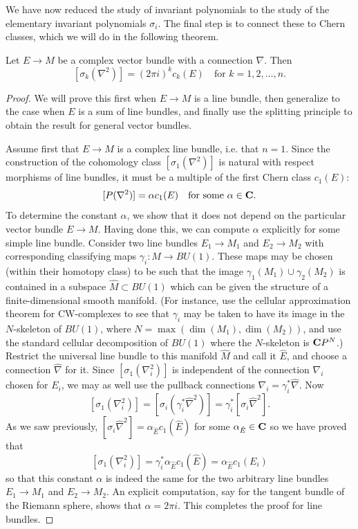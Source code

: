 \documentclass[a4paper,openany]{scrbook}
\begin{document}
We have now reduced the study of invariant polynomials to the study of the elementary invariant polynomials $\sigma_i$. The final step is to connect these to Chern classes, which we will do in the following theorem.

\begin{thm}
Let $E \to M$ be a complex vector bundle with a connection $\nabla$. Then
\[[\sigma_k(\nabla^2)] = (2\pi i)^kc_k(E) \quad \text{for } k = 1, 2, \ldots, n.\]
\begin{proof}
We will prove this first when $E \to M$ is a line bundle, then generalize to the case when $E$ is a sum of line bundles, and finally use the splitting principle to obtain the result for general vector bundles.

Assume first that $E \to M$ is a complex line bundle, i.e. that $n = 1$. Since the construction of the cohomology class $[\sigma_1(\nabla^2)]$ is natural with respect morphisms of line bundles, it must be a multiple of the first Chern class $c_1(E)$:
\[[P(\nabla^2)] = \alpha c_1(E) \quad\text{for some } \alpha \in \mathbf C.\]
To determine the constant $\alpha$, we show that it does not depend on the particular vector bundle $E \to M$. Having done this, we can compute $\alpha$ explicitly for some simple line bundle. Consider two line bundles $E_1 \to M_1$ and $E_2 \to M_2$ with corresponding classifying maps $\gamma_i \colon M \to BU(1)$. These maps may be chosen (within their homotopy class) to be such that the image $\gamma_1(M_1) \cup \gamma_2(M_2)$ is contained in a subspace $\hat M \subset BU(1)$ which can be given the structure of a finite-dimensional smooth manifold. (For instance, use the cellular approximation theorem for CW-complexes to see that $\gamma_i$ may be taken to have its image in the $N$-skeleton of $BU(1)$, where $N = \max(\dim(M_1), \dim(M_2))$, and use the standard cellular decomposition of $BU(1)$ where the $N$-skeleton is $\mathbf C P^N$.) Restrict the universal line bundle to this manifold $\hat M$ and call it $\hat E$, and choose a connection $\hat \nabla$ for it. Since $[\sigma_1(\nabla_i^2)]$ is independent of the connection $\nabla_i$ chosen for $E_i$, we may as well use the pullback connections $\nabla_i = \gamma_i^* \hat \nabla$. Now
\[[\sigma_1(\nabla_i^2)] = [\sigma_i(\gamma_i^* \hat \nabla^2)] = \gamma_i^* [\sigma_i \hat \nabla^2].\]
As we saw previously, $[\sigma_i \hat \nabla^2] = \alpha_{\hat E} c_1(\hat E)$ for some $\alpha_{\hat E} \in \mathbf C$ so we have proved that
\[[\sigma_1(\nabla_i^2)] = \gamma_i^* \alpha_{\hat E} c_1(\hat E) = \alpha_{\hat E} c_1(E_i)\]
so that this constant $\alpha$ is indeed the same for the two arbitrary line bundles $E_1 \to M_1$ and $E_2 \to M_2$. An explicit computation, say for the tangent bundle of the Riemann sphere, shows that $\alpha = 2\pi i$. This completes the proof for line bundles.


\end{proof}
\end{thm}
\end{document}
